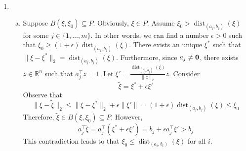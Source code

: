 \begin{enumerate}
	\item 

		\begin{enumerate}[(a)]
			\item Suppose $B(\xi, \xi_0)\subseteq P$. Obviously, $\xi\in P$. Assume $\xi_0 > \operatorname{dist}_{(a_j,b_j)}(\xi)$ for some $j\in \{1,\ldots, m\}$. In other words, we can find a number $\epsilon>0$ such that $\xi_0 \ge (1+\epsilon)\operatorname{dist}_{(a_j,b_j)}(\xi)$.  There exists an unique $\xi^*$ such that $\lVert \xi-\xi^*\rVert_2 = \operatorname{dist}_{(a_j,b_j)}(\xi)$. Furthermore, since $a_j\neq \textbf{0}$, there exists $z\in \mathbb{R}^n$ such that $a_j^\top z = 1$. Let $\xi' = \frac{\operatorname{dist}_{(a_j,b_j)}(\xi) }{\lVert z\rVert_2}z$.
			Consider 
			$$
			\widetilde{\xi} = \xi^* +  \epsilon \xi' 
			$$ Observe that
			$$
			\lVert \xi - \widetilde{\xi}\rVert_2 \le \lVert \xi - \xi^*\rVert_2 + \epsilon\lVert \xi'\rVert = (1+\epsilon)\operatorname{dist}_{(a_j,b_j)}(\xi) \le \xi_0
			$$
			Therefore, $\widetilde{\xi} \in B(\xi, \xi_0)\subseteq P$. However, 
			$$
			a_j^\top\widetilde{\xi} = a_j^\top(\xi^* + \epsilon \xi') = b_j + \epsilon a^\top_j\xi' > b_j
			$$ 
			This contradiction leads to that $\xi_0 \le \operatorname{dist}_{(a_i, b_i)}(\xi)$ for all $i$.
			

\end{enumerate}
\end{enumerate}
